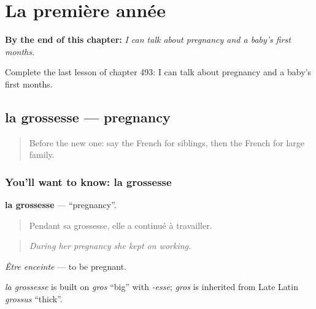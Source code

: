 
\chapter{La première année}
\label{ch:fr-la-premiere-annee}

\begin{chapteropening}
\textbf{By the end of this chapter:} \emph{I can talk about pregnancy and a baby's first months.}

Complete the last lesson of chapter 493: I can talk about pregnancy and a baby's first months.
\end{chapteropening}

\section[la grossesse]{la grossesse — pregnancy}

\label{lesson:FR-C493-grossesse}



\begin{quote}
Before the new one: say the French for siblings, then the French for large family.
\end{quote}

\subsection*{You'll want to know: la grossesse}
\textbf{la grossesse} — \textquotedblleft{}pregnancy\textquotedblright{}.

\begin{quote}
Pendant sa grossesse, elle a continué à travailler.
\end{quote}

\begin{quote}
\emph{During her pregnancy she kept on working.}
\end{quote}

\emph{Être enceinte} — to be pregnant.

\begin{cousinweb}
\emph{la grossesse} is built on \emph{gros} \textquotedblleft{}big\textquotedblright{} with \emph{-esse}; \emph{gros} is inherited from Late Latin \emph{grossus} \textquotedblleft{}thick\textquotedblright{}.
\end{cousinweb}


